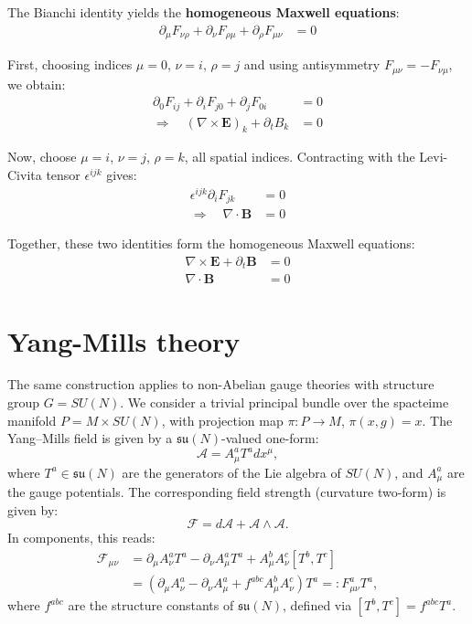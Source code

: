 The Bianchi identity yields the \textbf{homogeneous Maxwell equations}:
\begin{align*}
  \partial_\mu F_{\nu\rho} + \partial_\nu F_{\rho\mu} + \partial_\rho F_{\mu\nu} &= 0
\end{align*}

First, choosing indices \(\mu=0\), \(\nu=i\), \(\rho=j\) and using antisymmetry \(F_{\mu\nu} = -F_{\nu\mu}\), we obtain:
\begin{align*}
  \partial_0 F_{ij} + \partial_i F_{j0} + \partial_j F_{0i} &= 0 \\
  \Rightarrow \quad (\nabla \times \mathbf{E})_k + \partial_t B_k &= 0
\end{align*}

Now, choose \(\mu=i\), \(\nu=j\), \(\rho=k\), all spatial indices. Contracting with the Levi-Civita tensor \(\epsilon^{ijk}\) gives:
\begin{align*}
  \epsilon^{ijk} \partial_i F_{jk} &= 0 \\
  \Rightarrow \quad \nabla \cdot \mathbf{B} &= 0
\end{align*}

Together, these two identities form the homogeneous Maxwell equations:
\begin{align*}
  \nabla \times \mathbf{E} + \partial_t \mathbf{B} &= 0 \\
  \nabla \cdot \mathbf{B} &= 0
\end{align*}



\section{Yang-Mills theory}

The same construction applies to non-Abelian gauge theories with structure group \( G = SU(N) \). We consider a trivial principal bundle over the spacteime manifold \( P = M \times SU(N) \), with projection map \( \pi: P \to M \), \( \pi(x, g) = x \). The Yang–Mills field is given by a \( \mathfrak{su}(N) \)-valued one-form:
\[
\mathcal{A} = A_\mu^a T^a dx^\mu,
\]
where \( T^a \in \mathfrak{su}(N) \) are the generators of the Lie algebra of \( SU(N) \), and \( A_\mu^a \) are the gauge potentials. The corresponding field strength (curvature two-form) is given by:
\[
\mathscr{F} = d\mathcal{A} + \mathcal{A} \wedge \mathcal{A}.
\]
In components, this reads:
\begin{align*}
  \mathscr{F}_{\mu\nu} 
  &= \partial_\mu A_\nu^a T^a - \partial_\nu A_\mu^a T^a + A_\mu^b A_\nu^c [T^b, T^c] \\[0.8em]
  &= \left( \partial_\mu A_\nu^a - \partial_\nu A_\mu^a + f^{abc} A_\mu^b A_\nu^c \right) T^a 
  =: F_{\mu\nu}^a T^a,
\end{align*}
where \( f^{abc} \) are the structure constants of \( \mathfrak{su}(N) \), defined via \( [T^b, T^c] = f^{abc} T^a \).

